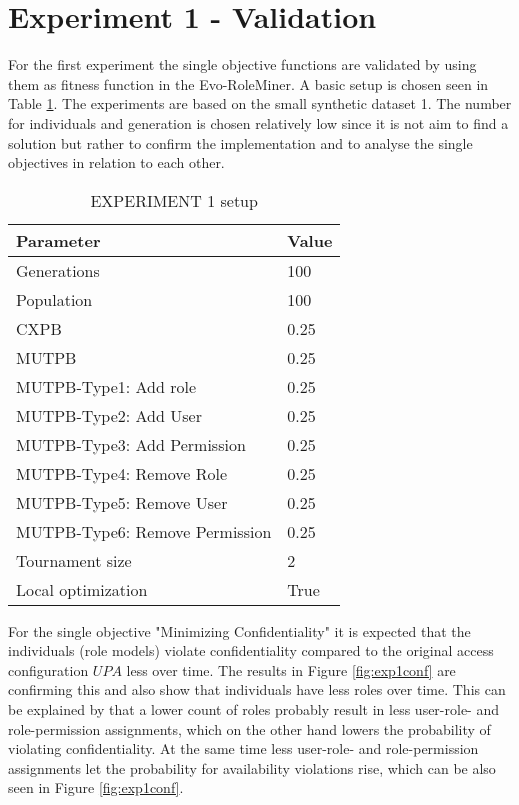 \section{Experiment 1 - Validation}
\label{sec:phase1}
For the first experiment the single objective functions are validated by using them as fitness function in the Evo-RoleMiner. A basic setup is chosen seen in Table \ref{tab:setup1}. The experiments are based on the small synthetic dataset 1. The number for individuals and generation is chosen relatively low since it is not aim to find a solution but rather to confirm the implementation and to analyse the single objectives in relation to each other. \\
\begin{table}[H]
    \centering
    \begin{tabular}{|l|l|}
        \hline
        \rowcolor{gray!25} 
        \textbf{Parameter}              & \textbf{Value}    \\ \hline
        Generations                     & 100              \\ \hline
        Population                      & 100              \\ \hline
        CXPB                            & 0.25              \\ \hline
        MUTPB                           & 0.25              \\ \hline
        MUTPB-Type1: Add role           & 0.25              \\ \hline
        MUTPB-Type2: Add User           & 0.25              \\ \hline
        MUTPB-Type3: Add Permission     & 0.25              \\ \hline
        MUTPB-Type4: Remove Role        & 0.25              \\ \hline
        MUTPB-Type5: Remove User        & 0.25              \\ \hline
        MUTPB-Type6: Remove Permission  & 0.25              \\ \hline
        Tournament size                 & 2                 \\ \hline
        Local optimization              & True              \\ \hline
    \end{tabular}
    \caption{EXPERIMENT 1 setup}
    \label{tab:setup1}
\end{table}
For the single objective "Minimizing Confidentiality" it is expected that the individuals (role models) violate confidentiality compared to the original access configuration $UPA$ less over time. The results in Figure \ref{fig:exp1conf} are confirming this and also show that individuals have less roles over time. This can be explained by that a lower count of roles probably result in less user-role- and role-permission assignments, which on the other hand lowers the probability of violating confidentiality. At the same time less user-role- and role-permission assignments let the probability for availability violations rise, which can be also seen in Figure \ref{fig:exp1conf}.

